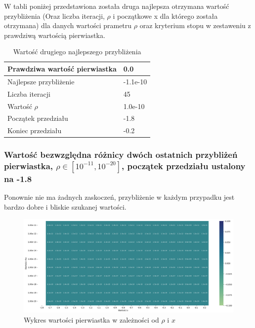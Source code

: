 \documentclass{article}
\begin{document}
\noindent
W tabli poniżej przedstawiona została druga najlepsza otrzymana wartość przybliżenia (Oraz liczba iteracji, \(\rho\) i początkowe x dla którego została otrzymana) dla danych wartości prametru \(\rho\) oraz kryterium stopu w zestaweniu z prawdziwą wartością pierwiastka.

\begin{table}[H]
    \centering
    \begin{tabular}{|l|l|}
    \hline
        Prawdziwa wartość pierwiastka & 0.0 \\ \hline
        Najlepsze przybliżenie & -1.1e-10 \\ \hline
        Liczba iteracji & 45 \\ \hline
        Wartość $\rho$ & 1.0e-10 \\ \hline
        Początek przedziału & -1.8 \\ \hline
        Koniec przedziału & -0.2 \\ \hline
    \end{tabular}
    \caption{Wartość drugiego najlepszego przybliżenia}
\end{table}

\subsubsection{Wartość bezwzględna różnicy dwóch ostatnich przybliżeń pierwiastka, \(\rho \in [10^{-11}, 10^{-20}]\), początek przedziału ustalony na -1.8}

Ponownie nie ma żadnych zaskoczeń, przybliżenie w każdym przypadku jest bardzo dobre i bliskie szukanej wartości.

\begin{figure}[H]
  \centering
  \begin{minipage}[b]{0.9\textwidth}
    \includegraphics[width=\textwidth]{heatmap19.png}
  \end{minipage}
  \caption{Wykres wartości pierwiastka w zależności od \(\rho\) i \(x\)}
\end{figure}
\end{document}
